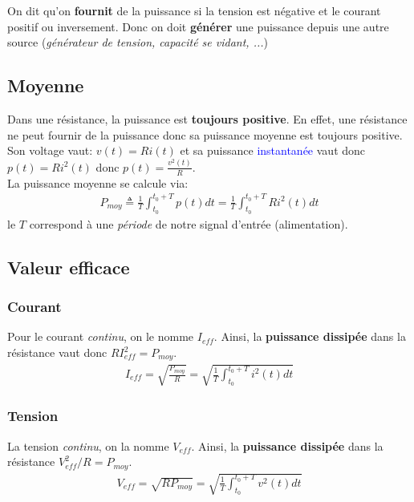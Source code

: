 \documentclass{report}
\begin{document}
On dit qu'on \textbf{fournit} de la puissance si la tension est négative et le courant positif ou inversement. Donc on doit \textbf{générer} une puissance depuis une autre source (\textit{générateur de tension, capacité se vidant, ...})

\subsection{Moyenne}
Dans une résistance, la puissance est \textbf{toujours positive}. En effet, une résistance ne peut fournir de la puissance donc sa puissance moyenne est toujours positive.\\
Son voltage vaut: $v(t) = R i(t)$ et sa puissance \textcolor{blue}{instantanée} vaut donc $p(t) = R i^2(t)$ donc $p(t) = \frac{v^2(t)}{R}$.\\
La puissance moyenne se calcule via:
\begin{align*}
P_{moy} \triangleq \frac{1}{T} \int_{t_0}^{t_0 + T} p(t) dt = \frac{1}{T}\int_{t_0}^{t_0 + T} R i^2 (t) dt
\end{align*}
le $T$ correspond à une \textit{période} de notre signal d'entrée (alimentation).

\subsection{Valeur efficace}

\subsubsection{Courant}
Pour le courant \textit{continu}, on le nomme $I_{eff}$. Ainsi, la \textbf{puissance dissipée} dans la résistance vaut donc $R I_{eff}^2 = P_{moy}$.
\begin{align*}
I_{eff} = \sqrt{\frac{P_{moy}}{R}} = \sqrt{\frac{1}{T}\int_{t_0}^{t_0 + T} i^2 (t) dt}
\end{align*}

\subsubsection{Tension}
La tension \textit{continu}, on la nomme $V_{eff}$. Ainsi, la \textbf{puissance dissipée} dans la résistance $V_{eff}^2 / R = P_{moy}$.
\begin{align*}
V_{eff} = \sqrt{R P_{moy}} = \sqrt{\frac{1}{T}\int_{t_0}^{t_0 + T} v^2 (t) dt}
\end{align*}
\end{document}

